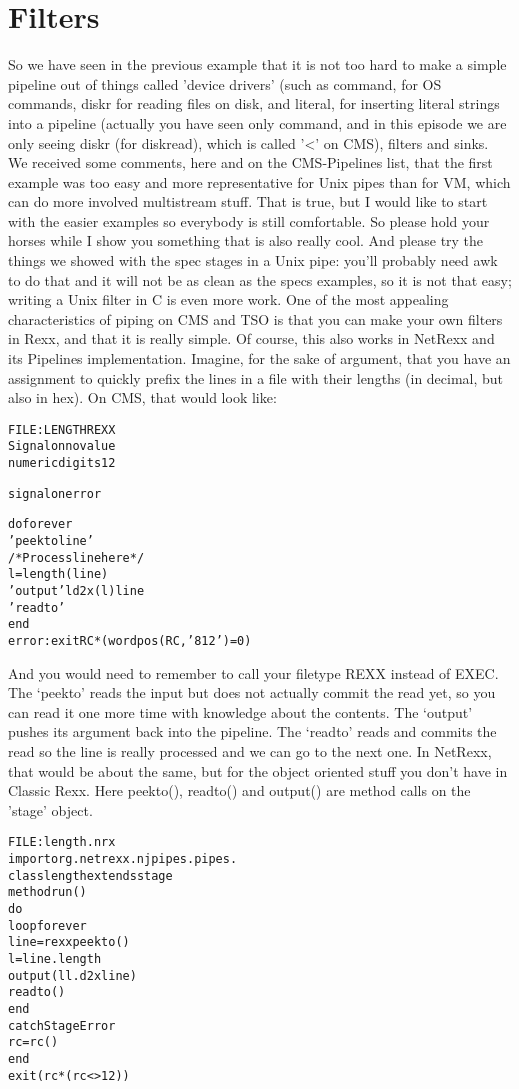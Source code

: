 \chapter{Filters}
So we have seen in the previous example that it is not too hard to make a simple pipeline out of things called 'device drivers' (such as command, for OS commands, diskr for reading files on disk, and literal, for inserting literal strings into a pipeline (actually you have seen only command, and in this episode we are only seeing diskr (for diskread), which is called '<' on CMS), filters and sinks.
We received some comments, here and on the CMS-Pipelines list, that the first example was too easy and more representative for Unix pipes than for VM, which can do more involved multistream stuff. That is true, but I would like to start with the easier examples so everybody is still comfortable. So please hold your horses while I show you something that is also really cool. And please try the things we showed with the spec stages in a Unix pipe: you'll probably need awk to do that and it will not be as clean as the specs examples, so it is not that easy; writing a Unix filter in C is even more work.
One of the most appealing characteristics of piping on CMS and TSO is
that you can make your own filters in Rexx, and that it is really
simple. Of course, this also works in NetRexx and its Pipelines
implementation. Imagine, for the sake of argument, that you have an
assignment to quickly prefix the lines in a file with their lengths
(in decimal, but also in hex). On CMS, that would look like:
\begin{alltt}
FILE: LENGTH REXX
Signal on novalue
numeric digits 12

signal on error

do forever
'peekto line'
/* Process line here */
l=length(line)
'output' l d2x(l) line
'readto'
end
error: exit RC*(wordpos(RC, '8 12')=0)
\end{alltt}
And you would need to remember to call your filetype REXX instead of EXEC.  The ‘peekto’ reads the input but does not actually commit the read yet, so you can read it one more time with knowledge about the contents. The ‘output’ pushes its argument back into the pipeline. The ‘readto’ reads and commits the read so the line is really processed and we can go to the next one.
In NetRexx, that would be about the same, but for the object oriented stuff you don't have in Classic Rexx. Here peekto(), readto() and output() are method calls on the ’stage’ object.
\begin{alltt}
FILE: length.nrx
import org.netrexx.njpipes.pipes.
class length extends stage
method run()
  do
    loop forever
      line = rexx peekto()
      l = line.length
      output(l l.d2x line)
      readto()
    end
  catch StageError
    rc = rc()
  end
  exit(rc*(rc<>12))
 \end{alltt}
